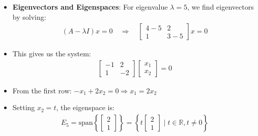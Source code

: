 \begin{frame}{}
\begin{itemize}
    \item \textbf{Eigenvectors and Eigenspaces}: For eigenvalue $\lambda = 5$, we find eigenvectors by solving:
    \begin{align}
        (A - \lambda I)x = 0 \quad \Longrightarrow \quad \begin{bmatrix}
            4-5 & 2 \\
            1 & 3-5
        \end{bmatrix}x = 0
    \end{align}
    \item This gives us the system:
    \begin{align}
        \begin{bmatrix}
            -1 & 2 \\
            1 & -2
        \end{bmatrix}\begin{bmatrix}
            x_1\\
            x_2
        \end{bmatrix} = 0
    \end{align}
    \item From the first row: $-x_1 + 2x_2 = 0 \Rightarrow x_1 = 2x_2$
    \item Setting $x_2 = t$, the eigenspace is:
    \begin{align}
        E_5 = \text{span}\left\{\begin{bmatrix} 2 \\ 1 \end{bmatrix}\right\} = \left\{t\begin{bmatrix} 2 \\ 1 \end{bmatrix} \mid t \in \mathbb{R}, t \neq 0\right\}
    \end{align}
\end{itemize}
\end{frame}



